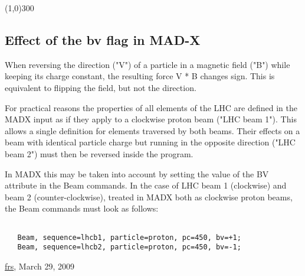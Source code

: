 

\line(1,0){300}


\subsection{Effect of the bv flag in MAD-X}

When reversing the direction ("V") of a particle in a magnetic field ("B") while keeping its charge constant, the resulting force V * B changes sign. This is equivalent to flipping the field, but not the direction. 

 For practical reasons the properties of all elements of the LHC are defined in the MADX input as if they apply to a clockwise proton beam ("LHC beam 1"). This allows a single definition for elements traversed by both beams. Their effects on a beam with identical particle charge but running in the opposite direction ("LHC beam 2") must then be reversed inside the program. 

 In MADX this may be taken into account by setting the value of the BV attribute in the Beam commands. In the case of LHC beam 1 (clockwise) and beam 2 (counter-clockwise), treated in MADX both as clockwise proton beams, the Beam commands must look as follows: %
\begin{verbatim}

   Beam, sequence=lhcb1, particle=proton, pc=450, bv=+1;
   Beam, sequence=lhcb2, particle=proton, pc=450, bv=-1;
\end{verbatim}

\href{http://www.cern.ch/Frank.Schmidt/frs_sign.html}{frs}, March 29, 2009 
